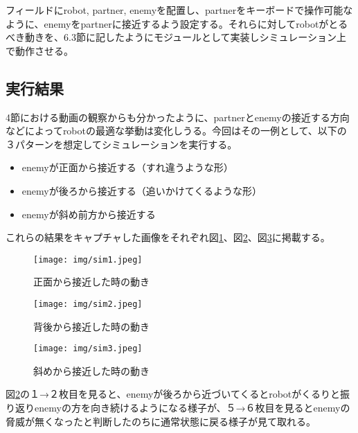 \documentclass{kuisthesis}
\begin{document}
フィールドにrobot, partner, enemyを配置し、partnerをキーボードで操作可能なように、enemyをpartnerに接近するよう設定する。それらに対してrobotがとるべき動きを、6.3節に記したようにモジュールとして実装しシミュレーション上で動作させる。


\subsection{実行結果}

4節における動画の観察からも分かったように、partnerとenemyの接近する方向などによってrobotの最適な挙動は変化しうる。今回はその一例として、以下の３パターンを想定してシミュレーションを実行する。

\begin{itemize}
	\item enemyが正面から接近する（すれ違うような形）
	\item enemyが後ろから接近する（追いかけてくるような形）
	\item enemyが斜め前方から接近する
\end{itemize}

これらの結果をキャプチャした画像をそれぞれ図\ref{fig:sim1}、図\ref{fig:sim2}、図\ref{fig:sim3}に掲載する。

\begin{figure}[p]\begin{center}
	\texttt{[image: img/sim1.jpeg]}
	\caption{正面から接近した時の動き}
	\label{fig:sim1}
\end{center}\end{figure}

\begin{figure}[p]\begin{center}
	\texttt{[image: img/sim2.jpeg]}
	\caption{背後から接近した時の動き}
	\label{fig:sim2}
\end{center}\end{figure}

\begin{figure}[p]\begin{center}
	\texttt{[image: img/sim3.jpeg]}
	\caption{斜めから接近した時の動き}
	\label{fig:sim3}
\end{center}\end{figure}

図\ref{fig:sim2}の１→２枚目を見ると、enemyが後ろから近づいてくるとrobotがくるりと振り返りenemyの方を向き続けるようになる様子が、５→６枚目を見るとenemyの脅威が無くなったと判断したのちに通常状態に戻る様子が見て取れる。
\end{document}

